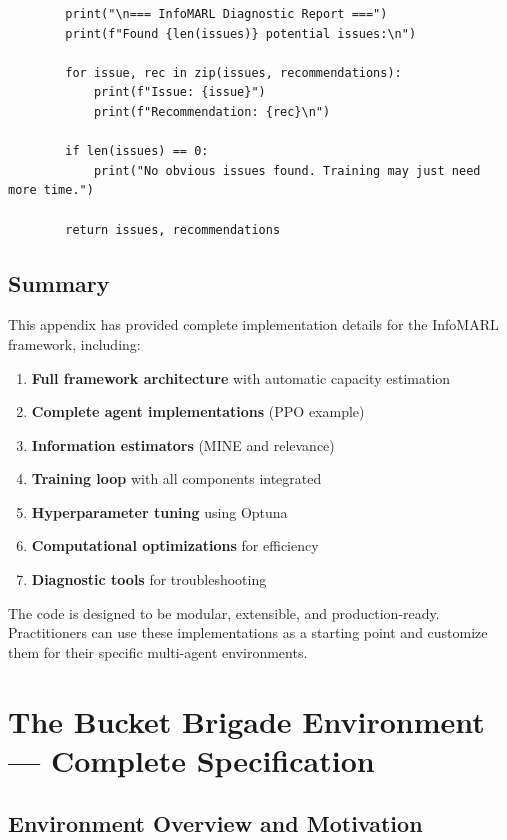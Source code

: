 \documentclass[10pt, letterpaper]{article}
\begin{document}
\begin{lstlisting}
        print("\n=== InfoMARL Diagnostic Report ===")
        print(f"Found {len(issues)} potential issues:\n")

        for issue, rec in zip(issues, recommendations):
            print(f"Issue: {issue}")
            print(f"Recommendation: {rec}\n")

        if len(issues) == 0:
            print("No obvious issues found. Training may just need more time.")

        return issues, recommendations
\end{lstlisting}

\subsection{Summary}

This appendix has provided complete implementation details for the InfoMARL framework, including:
\begin{enumerate}
    \item \textbf{Full framework architecture} with automatic capacity estimation
    \item \textbf{Complete agent implementations} (PPO example)
    \item \textbf{Information estimators} (MINE and relevance)
    \item \textbf{Training loop} with all components integrated
    \item \textbf{Hyperparameter tuning} using Optuna
    \item \textbf{Computational optimizations} for efficiency
    \item \textbf{Diagnostic tools} for troubleshooting
\end{enumerate}

The code is designed to be modular, extensible, and production-ready. Practitioners can use these implementations as a starting point and customize them for their specific multi-agent environments.

\section{The Bucket Brigade Environment --- Complete Specification}
\label{app:bucketbrigade}

\subsection{Environment Overview and Motivation}
\end{document}

